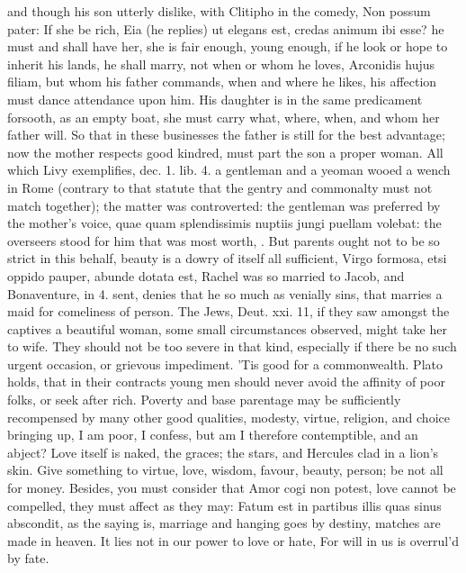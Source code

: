 {and though his son utterly dislike, with Clitipho in the comedy, Non
possum pater: If she be rich, Eia (he replies) ut elegans est, credas
animum ibi esse? he must and shall have her, she is fair enough, young
enough, if he look or hope to inherit his lands, he shall marry, not
when or whom he loves, Arconidis hujus filiam, but whom his father
commands, when and where he likes, his affection must dance attendance
upon him. His daughter is in the same predicament forsooth, as an empty
boat, she must carry what, where, when, and whom her father will. So
that in these businesses the father is still for the best advantage;
now the mother respects good kindred, must part the son a proper woman.
All which  Livy exemplifies, dec. 1. lib. 4. a gentleman and a
yeoman wooed a wench in Rome (contrary to that statute that the gentry
and commonalty must not match together); the matter was controverted:
the gentleman was preferred by the mother's voice, quae quam
splendissimis nuptiis jungi puellam volebat: the overseers stood for
him that was most worth, \etc{}. But parents ought not to be so strict in
this behalf, beauty is a dowry of itself all sufficient, Virgo
formosa, etsi oppido pauper, abunde dotata est, Rachel was so
married to Jacob, and Bonaventure, in 4. sent, denies that he so
much as venially sins, that marries a maid for comeliness of person.
The Jews, Deut. xxi. 11, if they saw amongst the captives a beautiful
woman, some small circumstances observed, might take her to wife. They
should not be too severe in that kind, especially if there be no such
urgent occasion, or grievous impediment. 'Tis good for a commonwealth.
Plato holds, that in their contracts young men should never avoid
the affinity of poor folks, or seek after rich. Poverty and base
parentage may be sufficiently recompensed by many other good qualities,
modesty, virtue, religion, and choice bringing up, I am poor, I
confess, but am I therefore contemptible, and an abject? Love itself is
naked, the graces; the stars, and Hercules clad in a lion's skin. Give
something to virtue, love, wisdom, favour, beauty, person; be not all
for money. Besides, you must consider that Amor cogi non potest, love
cannot be compelled, they must affect as they may: Fatum est in
partibus illis quas sinus abscondit, as the saying is, marriage and
hanging goes by destiny, matches are made in heaven.
It lies not in our power to love or hate,
For will in us is overrul'd by fate.

}
